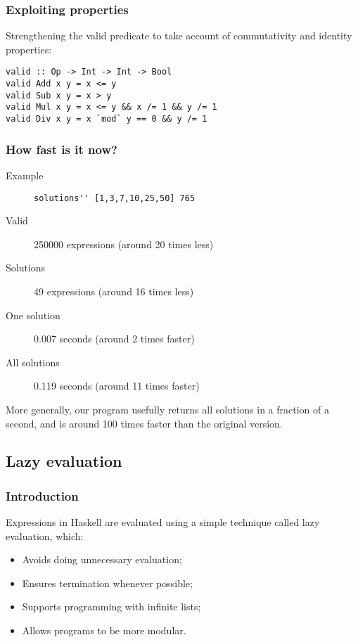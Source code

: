 \begin{multicols}{2}
\subsubsection{Exploiting properties}
Strengthening the valid predicate to take account of commutativity and identity properties:
\begin{lstlisting}
valid :: Op -> Int -> Int -> Bool
valid Add x y = x <= y
valid Sub x y = x > y
valid Mul x y = x <= y && x /= 1 && y /= 1
valid Div x y = x `mod` y == 0 && y /= 1
\end{lstlisting}

\subsubsection{How fast is it now?}
\begin{description}
  \item[Example] \lstinline{solutions'' [1,3,7,10,25,50] 765}
  \item[Valid] 250000 expressions (around 20 times less)
  \item[Solutions] 49 expressions (around 16 times less)
  \item[One solution] 0.007 seconds (around 2 times faster)
  \item[All solutions] 0.119 seconds (around 11 times faster)   
\end{description}

More generally, our program usefully returns all solutions in a fraction of a second, and is around 100 times faster than the original version.


\subsection{Lazy evaluation}
\subsubsection{Introduction}
Expressions in Haskell are evaluated using a simple technique called lazy evaluation, which:
\begin{itemize}
  \item Avoids doing unnecessary evaluation;
  \item Ensures termination whenever possible;
  \item Supports programming with infinite lists;
  \item Allows programs to be more modular.
\end{itemize}


\end{multicols}
